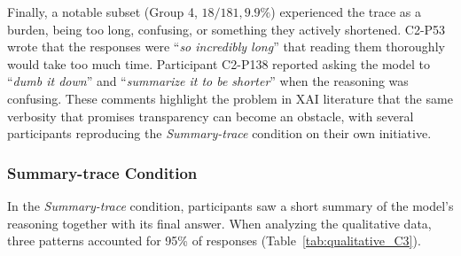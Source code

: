 \documentclass[manuscript,review,anonymous]{acmart}
\newcommand{\daniela}[1]{\textcolor{colordaniela}{\textbf{\faComment~Daniela:} #1}}
\begin{document}
Finally, a notable subset (Group 4, $18/181, 9.9\%$) experienced the trace as a burden, being too long, confusing, or something they actively shortened. C2-P53 wrote that the responses were ``\textit{so incredibly long}'' that reading them thoroughly would take too much time. Participant C2-P138 reported asking the model to ``\textit{dumb it down}'' and ``\textit{summarize it to be shorter}'' when the reasoning was confusing. These comments highlight the problem in XAI literature that the same verbosity that promises transparency can become an obstacle, with several participants reproducing the \textit{Summary-trace} condition on their own initiative.




\subsubsection{Summary-trace Condition}
In the \textit{Summary-trace} condition, participants saw a short summary of the model's reasoning together with its final answer. When analyzing the qualitative data, three patterns accounted for 95\% of responses (Table~\ref{tab:qualitative_C3}).
\end{document}
